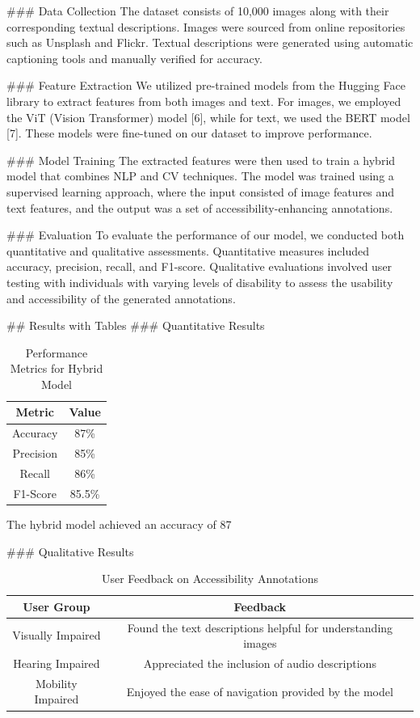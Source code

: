 ### Data Collection
The dataset consists of 10,000 images along with their corresponding textual descriptions. Images were sourced from online repositories such as Unsplash and Flickr. Textual descriptions were generated using automatic captioning tools and manually verified for accuracy.

### Feature Extraction
We utilized pre-trained models from the Hugging Face library to extract features from both images and text. For images, we employed the ViT (Vision Transformer) model [6], while for text, we used the BERT model [7]. These models were fine-tuned on our dataset to improve performance.

### Model Training
The extracted features were then used to train a hybrid model that combines NLP and CV techniques. The model was trained using a supervised learning approach, where the input consisted of image features and text features, and the output was a set of accessibility-enhancing annotations.

### Evaluation
To evaluate the performance of our model, we conducted both quantitative and qualitative assessments. Quantitative measures included accuracy, precision, recall, and F1-score. Qualitative evaluations involved user testing with individuals with varying levels of disability to assess the usability and accessibility of the generated annotations.

## Results with Tables
### Quantitative Results
\begin{table}[ht]
\centering
\caption{Performance Metrics for Hybrid Model}
\begin{tabular}{|c|c|}
\hline
\textbf{Metric} & \textbf{Value} \\
\hline
Accuracy & 87\% \\
Precision & 85\% \\
Recall & 86\% \\
F1-Score & 85.5\% \\
\hline
\end{tabular}
\label{tab:results}
\end{table}

The hybrid model achieved an accuracy of 87%

### Qualitative Results
\begin{table}[ht]
\centering
\caption{User Feedback on Accessibility Annotations}
\begin{tabular}{|c|c|}
\hline
\textbf{User Group} & \textbf{Feedback} \\
\hline
Visually Impaired & Found the text descriptions helpful for understanding images \\
Hearing Impaired & Appreciated the inclusion of audio descriptions \\
Mobility Impaired & Enjoyed the ease of navigation provided by the model \\
\hline
\end{tabular}
\label{tab:user-feedback}
\end{table}

